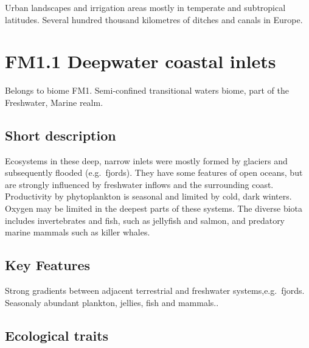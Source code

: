 \documentclass[
  letterpaper,
  DIV=11,
  numbers=noendperiod]{scrartcl}
\begin{document}
Urban landscapes and irrigation areas mostly in temperate and
subtropical latitudes. Several hundred thousand kilometres of ditches
and canals in Europe.

\section{FM1.1 Deepwater coastal
inlets}\label{fm1.1-deepwater-coastal-inlets}

Belongs to biome FM1. Semi-confined transitional waters biome, part of
the Freshwater, Marine realm.

\subsection{Short description}\label{short-description-22}

Ecosystems in these deep, narrow inlets were mostly formed by glaciers
and subsequently flooded (e.g.~fjords). They have some features of open
oceans, but are strongly influenced by freshwater inflows and the
surrounding coast. Productivity by phytoplankton is seasonal and limited
by cold, dark winters. Oxygen may be limited in the deepest parts of
these systems. The diverse biota includes invertebrates and fish, such
as jellyfish and salmon, and predatory marine mammals such as killer
whales.

\subsection{Key Features}\label{key-features-22}

Strong gradients between adjacent terrestrial and freshwater
systems,e.g.~fjords. Seasonaly abundant plankton, jellies, fish and
mammals..

\subsection{Ecological traits}\label{ecological-traits-22}
\end{document}
